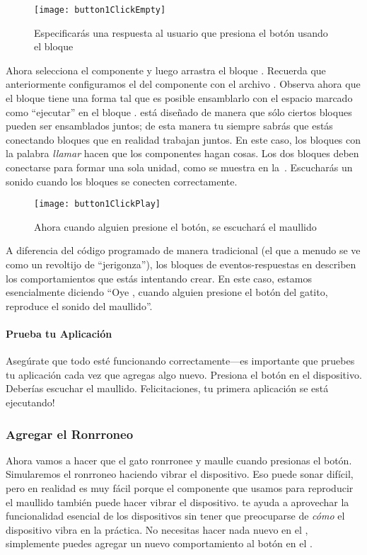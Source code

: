 \begin{figure}[H]
\centering
\texttt{[image: button1ClickEmpty]}
\caption{Especificarás una respuesta al usuario que presiona el botón
  usando el bloque }
\label{fig:button1ClickEmpty}
\end{figure}

Ahora selecciona el componente  y luego arrastra el
bloque . Recuerda que anteriormente
configuramos el  del componente con el archivo
. Observa ahora que el bloque  tiene una forma tal que es posible ensamblarlo
con el espacio marcado como ``ejecutar'' en el bloque
. \AppInventor está diseñado de manera que sólo
ciertos bloques pueden ser ensamblados juntos; de esta manera tu
siempre sabrás que estás conectando bloques que en realidad trabajan
juntos. En este caso, los bloques con la palabra \emph{llamar} hacen
que los componentes hagan cosas. Los dos bloques deben conectarse para
formar una sola unidad, como se muestra en
la~. Escucharás un sonido cuando los
bloques se conecten correctamente.

\begin{figure}[H]
\centering
\texttt{[image: button1ClickPlay]}
\caption{Ahora cuando alguien presione el botón, se escuchará el maullido}
\label{fig:button1ClickPlay}
\end{figure}

A diferencia del código programado de manera tradicional (el que a
menudo se ve como un revoltijo de ``jerigonza''), los bloques de
eventos-respuestas en \AppInventor describen los comportamientos que
estás intentando crear. En este caso, estamos esencialmente diciendo
``Oye \AppInventor, cuando alguien presione el botón del gatito,
reproduce el sonido del maullido''.

\paragraph{Prueba tu Aplicación} Asegúrate que todo esté funcionando
correctamente---es importante que pruebes tu aplicación cada vez que
agregas algo nuevo. Presiona el botón en el dispositivo. Deberías
escuchar el maullido. Felicitaciones, tu primera aplicación se está
ejecutando!

\subsubsection*{Agregar el Ronrroneo}
Ahora vamos a hacer que el gato ronrronee y maulle cuando presionas el
botón. Simularemos el ronrroneo haciendo vibrar el dispositivo. Eso
puede sonar difícil, pero en realidad es muy fácil porque el
componente  que usamos para reproducir el maullido
también puede hacer vibrar el dispositivo. \AppInventor te ayuda a
aprovechar la funcionalidad esencial de los dispositivos sin tener que
preocuparse de \emph{cómo} el dispositivo vibra en la práctica. No
necesitas hacer nada nuevo en el \designer, simplemente puedes agregar
un nuevo comportamiento al botón en el \blockEditor.

